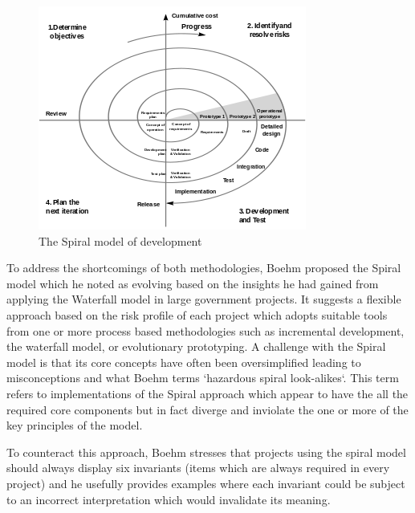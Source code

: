 \documentclass[a4paper,Times New Roman 11pt]{article}
\begin{document}
\begin{samepage}
\begin{samepage}
 \begin{figure}[h!]
  \includegraphics[scale=0.9]{spiralmodel.png}
  \caption{The Spiral model of development}
  \label{fig:spiral_model}
\end{figure}
To address the shortcomings of both methodologies, Boehm proposed the Spiral model which he noted as evolving based on the insights he had gained from applying the Waterfall model in large government projects.
It suggests a flexible approach based on the risk profile of each project which adopts suitable tools from one or more process based methodologies such as incremental development, the waterfall model, or evolutionary prototyping. A challenge with the Spiral model is that its core concepts have often been oversimplified leading to misconceptions and what Boehm terms `hazardous spiral look-alikes`. This term refers to implementations of the Spiral approach which appear to have the all the required core components but in fact diverge and inviolate the one or more of the key principles of the model. 


To counteract this approach, Boehm stresses that projects using the spiral model should always display six invariants (items which are always required in every project) and he usefully provides examples where each invariant could be subject to an incorrect interpretation which would invalidate its meaning.

\begin{itemize}


\end{itemize}
\end{samepage}
\end{samepage}
\end{document}
